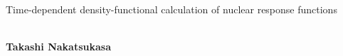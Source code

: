 \documentclass[twoside]{article}
\begin{document}
\thispagestyle{plain}

\begin{center}
{\Large \bf \strut
Time-dependent density-functional calculation of nuclear response functions
\strut}\\
\vspace{10mm}
{\large \bf 
Takashi Nakatsukasa}
\end{center}
\end{document}
